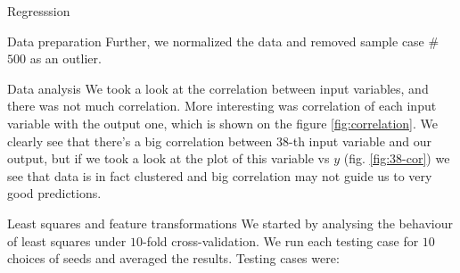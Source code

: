 \documentclass{article}
\begin{document}
\begin{section}{Regresssion}
\begin{subsection}{Data preparation}
Further, we normalized the data and removed sample case \#$500$ as an outlier.
\end{subsection}
\begin{subsection}{Data analysis}
We took a look at the correlation between input variables, and there was not much correlation. More interesting was correlation of each input variable with the output one, which is shown on the figure \ref{fig:correlation}. We clearly see that there's a big correlation between $38$-th input variable and our output, but if we took a look at the plot of this variable vs $y$ (fig. \ref{fig:38-cor}) we see that data is in fact clustered and big correlation may not guide us to very good predictions.
\begin{figure}[!h]
\center
{}
\hfill
{}
\caption{}
\end{figure}
\end{subsection}
\begin{subsection}{Least squares and feature transformations}
We started by analysing the behaviour of least squares under $10$-fold cross-validation. We run each testing case for $10$ choices of seeds and averaged the results. Testing cases were:

\end{subsection}
\end{section}
\end{document}
